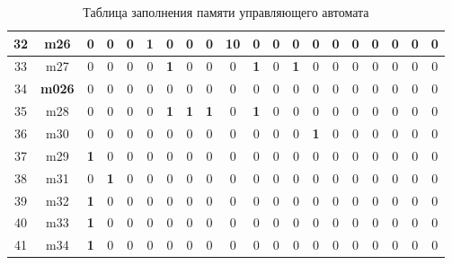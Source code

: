 \documentclass[a4paper,14pt]{extarticle}
\begin{document}
\begin{landscape}
\begin{table}[h!]
\begin{tabular}{|c||c|c|c|c|c|c|c|c|c|c|c|c||c|c|c|c|c|c|c|}
			32 & m26 & 0 & 0 & 0 & \textbf{1} & 0 & 0 & 0 & \textbf{10} & 0 & 0 & 0 & 0 & 0 & 0 & 0 & 0 & 0 & 0 \\ \hline
			33 & m27 & 0 & 0 & 0 & 0 & \textbf{1} & 0 & 0 & 0 & \textbf{1} & 0 & \textbf{1} & 0 & 0 & 0 & 0 & 0 & 0 & 0 \\ \hline
			34 & \textbf{m026} & 0 & 0 & 0 & 0 & 0 & 0 & 0 & 0 & 0 & 0 & 0 & 0 & 0 & 0 & 0 & 0 & 0 & 0 \\ \hline
			35 & m28 & 0 & 0 & 0 & 0 & \textbf{1} & \textbf{1} & \textbf{1} & 0 & \textbf{1} & 0 & 0 & 0 & 0 & 0 & 0 & 0 & 0 & 0 \\ \hline
			36 & m30 & 0 & 0 & 0 & 0 & 0 & 0 & 0 & 0 & 0 & 0 & 0 & \textbf{1} & 0 & 0 & 0 & 0 & 0 & 0 \\ \hline
			37 & m29 & \textbf{1} & 0 & 0 & 0 & 0 & 0 & 0 & 0 & 0 & 0 & 0 & 0 & 0 & 0 & 0 & 0 & 0 & 0 \\ \hline
			38 & m31 & 0 & \textbf{1} & 0 & 0 & 0 & 0 & 0 & 0 & 0 & 0 & 0 & 0 & 0 & 0 & 0 & 0 & 0 & 0 \\ \hline
			39 & m32 & \textbf{1} & 0 & 0 & 0 & 0 & 0 & 0 & 0 & 0 & 0 & 0 & 0 & 0 & 0 & 0 & 0 & 0 & 0 \\ \hline
			40 & m33 & \textbf{1} & 0 & 0 & 0 & 0 & 0 & 0 & 0 & 0 & 0 & 0 & 0 & 0 & 0 & 0 & 0 & 0 & 0 \\ \hline
			41 & m34 & \textbf{1} & 0 & 0 & 0 & 0 & 0 & 0 & 0 & 0 & 0 & 0 & 0 & 0 & 0 & 0 & 0 & 0 & 0 \\ \hline
	\end{tabular}
		\caption{Таблица заполнения памяти управляющего автомата}
	\label{tab:coursememory1}
\end{table}
\end{landscape}
\end{document}
